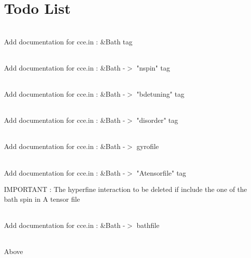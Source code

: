 \chapter{Todo List}
\hypertarget{todo}{}\label{todo}

\begin{DoxyRefList}
\item[Member \doxylink{structBathArray_a807633d8e314f488e12dfc95040ecc01}{Bath\+Array\+::bath} ]\hfill \\
\label{todo__todo000012}%
%
Add documentation for cce.\+in \+: \&Bath tag  
\item[Member \doxylink{structBathArray_ac71d275f6b9a2293d80fe8edf69fc46f}{Bath\+Array\+::nspin} ]\hfill \\
\label{todo__todo000011}%
%
Add documentation for cce.\+in \+: \&Bath -\/\texorpdfstring{$>$}{>} "{}nspin"{} tag  
\item[Member \doxylink{structBathSpin_a045005fcc1f5517a81e47e4a8b30e2f4}{Bath\+Spin\+::detuning} ]\hfill \\
\label{todo__todo000006}%
%
Add documentation for cce.\+in \+: \&Bath -\/\texorpdfstring{$>$}{>} "{}bdetuning"{} tag  
\item[Member \doxylink{structBathSpin_aad59ec954d15643047790f148dcca39b}{Bath\+Spin\+::disorder} ]\hfill \\
\label{todo__todo000007}%
%
Add documentation for cce.\+in \+: \&Bath -\/\texorpdfstring{$>$}{>} "{}disorder"{} tag  
\item[Member \doxylink{structBathSpin_a8c6487e73c2ef39b7a12d293ff5a1e4d}{Bath\+Spin\+::gyro} ]\hfill \\
\label{todo__todo000002}%
%
Add documentation for cce.\+in \+: \&Bath -\/\texorpdfstring{$>$}{>} gyrofile  
\item[Member \doxylink{structBathSpin_aad4ead2e39f4ae27fab5701662e7ee27}{Bath\+Spin\+::hypf} ]\hfill \\
\label{todo__todo000008}%
%
Add documentation for cce.\+in \+: \&Bath -\/\texorpdfstring{$>$}{>} "{}\+Atensorfile"{} tag 



IMPORTANT \+: The hyperfine interaction to be deleted if  include the one of the bath spin in A tensor file  
\item[Member \doxylink{structBathSpin_a2158c37aefcd8093520106945f5f7463}{Bath\+Spin\+::name} \mbox{[}MAX\+\_\+\+CHARARRAY\+\_\+\+LENGTH\mbox{]}]\hfill \\
\label{todo__todo000001}%
%
Add documentation for cce.\+in \+: \&Bath -\/\texorpdfstring{$>$}{>} bathfile  
\item[Member \doxylink{structBathSpin_a304f556a5ba51a1275171e40d212d0d2}{Bath\+Spin\+::quad} ]\hfill \\
\label{todo__todo000009}%
%
Above


\end{DoxyRefList}
